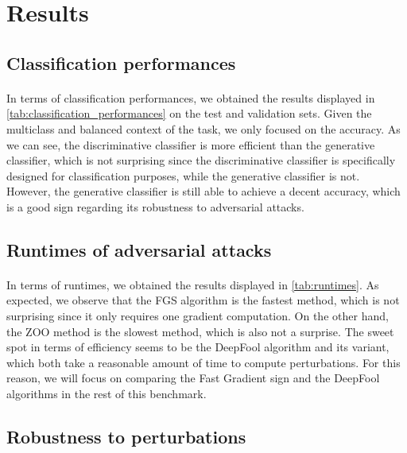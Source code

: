\documentclass[11pt,twocolumn,letterpaper]{article}
\begin{document}
\section{Results}
\label{sec:results}

\subsection{Classification performances}

\paragraph{} In terms of classification performances, we obtained the results displayed in \cref{tab:classification_performances} on the test and validation sets. Given the multiclass and balanced context of the task, we only focused on the accuracy. As we can see, the discriminative classifier is more efficient than the generative classifier, which is not surprising since the discriminative classifier is specifically designed for classification purposes, while the generative classifier is not. However, the generative classifier is still able to achieve a decent accuracy, which is a good sign regarding its robustness to adversarial attacks.

\subsection{Runtimes of adversarial attacks}

\paragraph{} In terms of runtimes, we obtained the results displayed in \cref{tab:runtimes}. As expected, we observe that the FGS algorithm is the fastest method, which is not surprising since it only requires one gradient computation. On the other hand, the ZOO method is the slowest method, which is also not a surprise. The sweet spot in terms of efficiency seems to be the DeepFool algorithm and its variant, which both take a reasonable amount of time to compute perturbations. For this reason, we will focus on comparing the Fast Gradient sign and the DeepFool algorithms in the rest of this benchmark.

\subsection{Robustness to perturbations}
\end{document}
